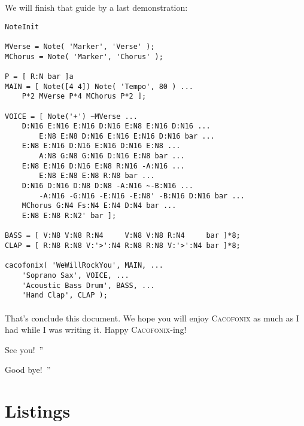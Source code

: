 \documentclass{article}
\newcommand{\cacofonix}{\textsc{Cacofonix}\xspace}
\newenvironment{meenv}{ \par \noindent \makebox[6em][r]{ \textcolor{mecolor}{Me}: `` --~}}{~''}
\newenvironment{myselfenv}{ \par \noindent \makebox[6em][r]{ \textcolor{myselfcolor}{Myself}: `` --~}}{~''}
\newcommand{\me}[1]{\begin{meenv}#1\end{meenv}}
\newcommand{\myself}[1]{\begin{myselfenv}#1\end{myselfenv}}
\begin{document}
We will finish that guide by a last demonstration:


\begin{lstlisting}
NoteInit

MVerse = Note( 'Marker', 'Verse' );
MChorus = Note( 'Marker', 'Chorus' );

P = [ R:N bar ]a
MAIN = [ Note([4 4]) Note( 'Tempo', 80 ) ...
	P*2 MVerse P*4 MChorus P*2 ];

VOICE = [ Note('+') ~MVerse ...
	D:N16 E:N16 E:N16 D:N16 E:N8 E:N16 D:N16 ...
		E:N8 E:N8 D:N16 E:N16 E:N16 D:N16 bar ...
	E:N8 E:N16 D:N16 E:N16 D:N16 E:N8 ...
		A:N8 G:N8 G:N16 D:N16 E:N8 bar ...
	E:N8 E:N16 D:N16 E:N8 R:N16 -A:N16 ...
		E:N8 E:N8 E:N8 R:N8 bar ...
	D:N16 D:N16 D:N8 D:N8 -A:N16 ~-B:N16 ...
		-A:N16 -G:N16 -E:N16 -E:N8' -B:N16 D:N16 bar ...
	MChorus G:N4 Fs:N4 E:N4 D:N4 bar ...
	E:N8 E:N8 R:N2' bar ];

BASS = [ V:N8 V:N8 R:N4     V:N8 V:N8 R:N4     bar ]*8;
CLAP = [ R:N8 R:N8 V:'>':N4 R:N8 R:N8 V:'>':N4 bar ]*8;

cacofonix( 'WeWillRockYou', MAIN, ...
	'Soprano Sax', VOICE, ...
	'Acoustic Bass Drum', BASS, ...
	'Hand Clap', CLAP );
\end{lstlisting}

\paragraph{}

That's conclude this document. We hope you will enjoy \cacofonix as much as I had while I was writing it. Happy \cacofonix-ing!

\me{See you!}
\myself{Good bye!}

\appendix

\section{Listings}
\end{document}
